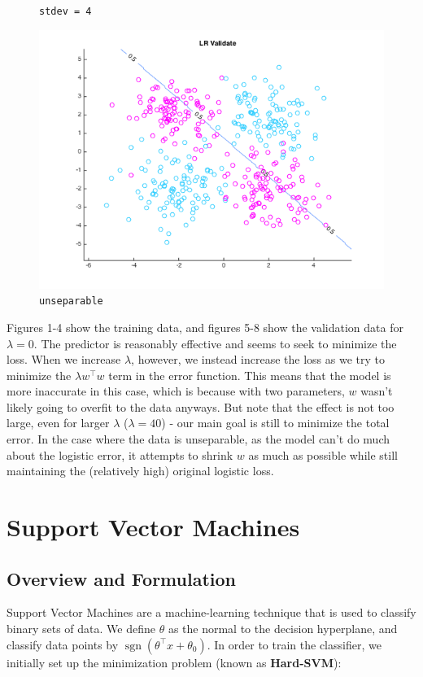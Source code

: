 \documentclass[10pt,letterpaper]{article}
\DeclareMathOperator{\sign}{sgn}
\begin{document}
\begin{figure}[!htb]
  \caption{\texttt{stdev = 4}}\label{fig:gradDifS}
\endminipage\hfill
{}
  \includegraphics[width=\linewidth]{figures/sdnv20.png}
  \caption{\texttt{unseparable}}\label{fig:gradDifS}
\endminipage

\end{figure}

Figures 1-4 show the training data, and figures 5-8 show the validation data for $\lambda = 0$. The predictor is reasonably effective and seems to seek to minimize the loss. When we increase $\lambda$, however, we instead increase the loss as we try to minimize the $\lambda w^\intercal w$ term in the error function. This means that the model is more inaccurate in this case, which is because with two parameters, $w$ wasn't likely going to overfit to the data anyways. But note that the effect is not too large, even for larger $\lambda$ ($\lambda = 40$) - our main goal is still to minimize the total error. In the case where the data is unseparable, as the model can't do much about the logistic error, it attempts to shrink $w$ as much as possible while still maintaining the (relatively high) original logistic loss.




\section{Support Vector Machines}
\subsection{Overview and Formulation}
Support Vector Machines are a machine-learning technique that is used to classify binary sets of data. We define $\theta$ as the normal to the decision hyperplane, and classify data points by $\sign (\theta^\intercal x + \theta_0)$. In order to train the classifier, we initially set up the minimization problem (known as \textbf{Hard-SVM}):
\end{document}
